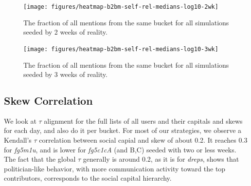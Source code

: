 \documentclass[10pt,oneside]{memoir}
\begin{document}
\begin{figure}
\begin{center}
    \texttt{[image: figures/heatmap-b2bm-self-rel-medians-log10-2wk]}
    \caption{The fraction of all mentions from the same bucket for all simulations seeded by 2 weeks of reality.}
    \label{figure:heatmap-b2bm-self-rel-medians-2wk}
\end{center}
\end{figure}

\begin{figure}
\begin{center}
    \texttt{[image: figures/heatmap-b2bm-self-rel-medians-log10-3wk]}
    \caption{The fraction of all mentions from the same bucket for all simulations seeded by 3 weeks of reality.}
    \label{figure:heatmap-b2bm-self-rel-medians-3wk}
\end{center}
\end{figure}
\pagebreak \subsection{Skew Correlation}
\label{skewcorrelation}

We look at $\tau$ alignment for the full lists of all users and their capitals and skews for each day, and also do it per bucket. 
For most of our strategies, we observe a Kendall's $\tau$ correlation between social capial and skew of about 0.2.  It reaches 0.3 for {\itshape fg5m1u}, and is lower for {\itshape fg5c1cA} (and B,C) seeded with two or less weeks.
The fact that the global $\tau$ generally is around 0.2, as it is for {\itshape dreps}, shows that politician-like behavior, with more communication activity toward the top contributors, corresponds to the social capital hierarchy.
\end{document}

